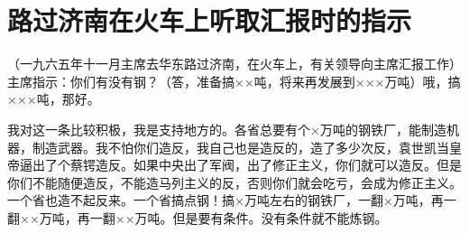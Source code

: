 \section[路过济南在火车上听取汇报时的指示（一九六五年十一月）]{路过济南在火车上听取汇报时的指示}


（一九六五年十一月主席去华东路过济南，在火车上，有关领导向主席汇报工作）主席指示：你们有没有钢？（答，准备搞××吨，将来再发展到×××万吨）哦，搞×××吨，那好。

我对这一条比较积极，我是支持地方的。各省总要有个×万吨的钢铁厂，能制造机器，制造武器。我不怕你们造反，我自己也是造反的，造了多少次反，袁世凯当皇帝逼出了个蔡锷造反。如果中央出了军阀，出了修正主义，你们就可以造反。但是你们不能随便造反，不能造马列主义的反，否则你们就会吃亏，会成为修正主义。一个省也造不起反来。一个省搞点钢！搞×万吨左右的钢铁厂，一翻×万吨，再一翻××万吨，再一翻××万吨。但是要有条件。没有条件就不能炼钢。

